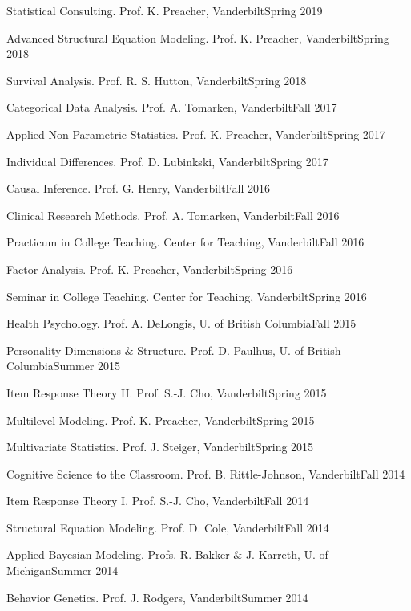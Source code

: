 \begin{etaremune}
\item Statistical Consulting. Prof. K. Preacher, Vanderbilt\hfill{Spring 2019}
\item Advanced Structural Equation Modeling. Prof. K. Preacher, Vanderbilt\hfill{Spring 2018}
\item Survival Analysis. Prof. R. S. Hutton, Vanderbilt\hfill{Spring 2018}
\item Categorical Data Analysis. Prof. A. Tomarken, Vanderbilt\hfill{Fall 2017}
\item Applied Non-Parametric Statistics.  Prof. K. Preacher, Vanderbilt\hfill{Spring 2017}
\item Individual Differences.  Prof. D. Lubinkski, Vanderbilt\hfill{Spring 2017}
\item Causal Inference. Prof. G. Henry, Vanderbilt\hfill{Fall 2016}
\item Clinical Research Methods. Prof. A. Tomarken, Vanderbilt\hfill{Fall 2016}
\item Practicum in College Teaching. Center for Teaching, Vanderbilt\hfill{Fall 2016}
\item Factor Analysis. Prof. K. Preacher, Vanderbilt\hfill{Spring 2016}
\item Seminar in College Teaching. Center for Teaching, Vanderbilt\hfill{Spring 2016}
\item Health Psychology.  Prof. A. DeLongis, U. of British Columbia\hfill{Fall 2015}
\item Personality Dimensions \& Structure.  Prof. D. Paulhus, U. of British Columbia\hfill{Summer 2015}
\item Item Response Theory \textrm{II}. Prof. S.-J. Cho, Vanderbilt\hfill{Spring 2015}
\item Multilevel Modeling. Prof. K. Preacher, Vanderbilt\hfill{Spring 2015}
\item Multivariate Statistics. Prof. J. Steiger, Vanderbilt\hfill{Spring 2015}
\item Cognitive Science to the Classroom. Prof. B. Rittle-Johnson, Vanderbilt\hfill{Fall 2014}
\item Item Response Theory \textrm{I}. Prof. S.-J. Cho, Vanderbilt\hfill{Fall 2014}
\item Structural Equation Modeling. Prof. D. Cole, Vanderbilt\hfill{Fall 2014}
\item Applied Bayesian Modeling. Profs. R. Bakker \& J. Karreth, U. of Michigan\hfill{Summer 2014}
\item Behavior Genetics. Prof. J. Rodgers, Vanderbilt\hfill{Summer 2014}

\end{etaremune}
